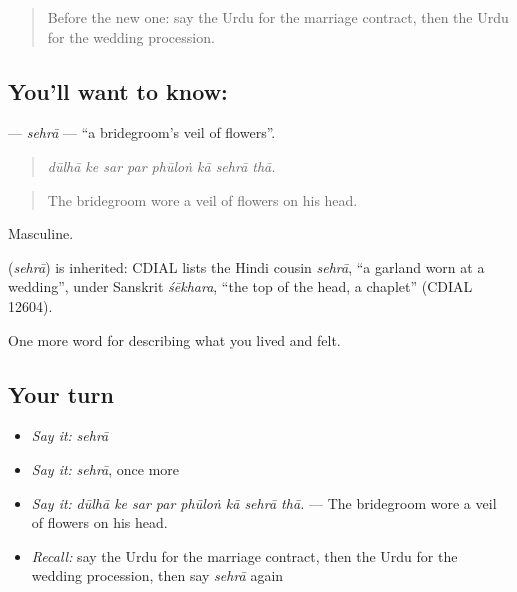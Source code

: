 \label{lesson:UR-C487-sehra}



\begin{quote}
Before the new one: say the Urdu for the marriage contract, then the Urdu for the wedding procession.
\end{quote}

\subsection*{You'll want to know: }
\textbf{} — \emph{sehrā} — \textquotedblleft{}a bridegroom's veil of flowers\textquotedblright{}.

\begin{quote}
       
\end{quote}

\begin{quote}
\emph{dūlhā ke sar par phūloṅ kā sehrā thā.}
\end{quote}

\begin{quote}
The bridegroom wore a veil of flowers on his head.
\end{quote}

Masculine.

\begin{cousinweb}
\textbf{} (\emph{sehrā}) is inherited: CDIAL lists the Hindi cousin \emph{sehrā}, \textquotedblleft{}a garland worn at a wedding\textquotedblright{}, under Sanskrit \emph{śēkhara}, \textquotedblleft{}the top of the head, a chaplet\textquotedblright{} (CDIAL 12604).
\end{cousinweb}

\begin{grammarlens}[title={What you've built}]
One more word for describing what you lived and felt.
\end{grammarlens}

\subsection*{Your turn}
\begin{itemize}
\raggedright
  \item \emph{Say it:} \emph{sehrā}
  \item \emph{Say it:} \emph{sehrā}, once more
  \item \emph{Say it:} \emph{dūlhā ke sar par phūloṅ kā sehrā thā.} — The bridegroom wore a veil of flowers on his head.
  \item \emph{Recall:} say the Urdu for the marriage contract, then the Urdu for the wedding procession, then say \emph{sehrā} again
\end{itemize}

